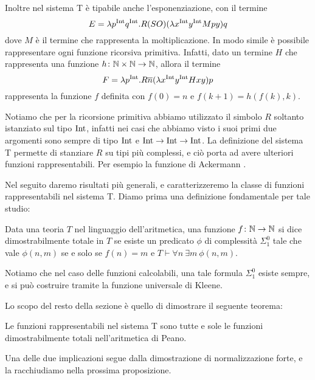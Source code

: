 \documentclass[]{marticle}
\begin{document}
Inoltre nel sistema T \`e tipabile anche l'esponenziazione, con il termine
\[
    E = \lambda p^{\text{Int}} q^{\text{Int}} . R (SO) (\lambda x^{\text{Int}} y^{\text{Int}} Mpy) q
\]
dove $M$ \`e il termine che rappresenta la moltiplicazione. In modo simile \` e
possibile rappresentare ogni funzione ricorsiva primitiva. Infatti, dato un
termine $H$ che rappresenta una funzione $h\colon\mathbb{N}\times\mathbb{N}\rightarrow\mathbb{N}$, allora il
termine
\[
    F = \lambda p^{\text{Int}} . R \overline{n} (\lambda x^{\text{Int}} y^{\text{Int}} Hxy) p
\]
rappresenta la funzione $f$ definita con $f(0) = n$ e $f(k+1) = h(f(k),k)$.

Notiamo che per la ricorsione primitiva abbiamo utilizzato il simbolo $R$
soltanto istanziato sul tipo $\text{Int}$, infatti nei casi che abbiamo visto i suoi
primi due argomenti sono sempre di tipo $\text{Int}$ e $\text{Int}\rightarrow\text{Int}\rightarrow\text{Int}$.
La definizione del sistema T permette di stanziare $R$ su tipi pi\`u complessi,
e ci\`o porta ad avere ulteriori funzioni rappresentabili. Per esempio la
funzione di Ackermann .

Nel seguito daremo risultati pi\`u generali, e caratterizzeremo la classe di
funzioni rappresentabili nel sistema T. Diamo prima una definizione fondamentale
per tale studio:
\begin{block}[Definizione]
    Data una teoria $T$ nel linguaggio dell'aritmetica, una funzione
    $f\colon\mathbb{N}\rightarrow\mathbb{N}$ si dice dimostrabilmente totale in $T$ se esiste un
    predicato $\phi$ di complessit\`a $\Sigma^0_1$ tale che vale $\phi(n,m)$ se
    e solo se $f(n)=m$ e $T\vdash \forall n\ \exists m\ \phi(n,m)$.
\end{block}

Notiamo che nel caso delle funzioni calcolabili, una tale formula $\Sigma^0_1$
esiste sempre, e si pu\`o costruire tramite la funzione universale di Kleene.

Lo scopo del resto della sezione \`e quello di dimostrare il seguente teorema:

\begin{block}[Teorema]
    Le funzioni rappresentabili nel sistema T sono tutte e sole le funzioni
    dimostrabilmente totali nell'aritmetica di Peano.
\end{block}

Una delle due implicazioni segue dalla dimostrazione di normalizzazione forte, e
la racchiudiamo nella prossima proposizione.
\end{document}
